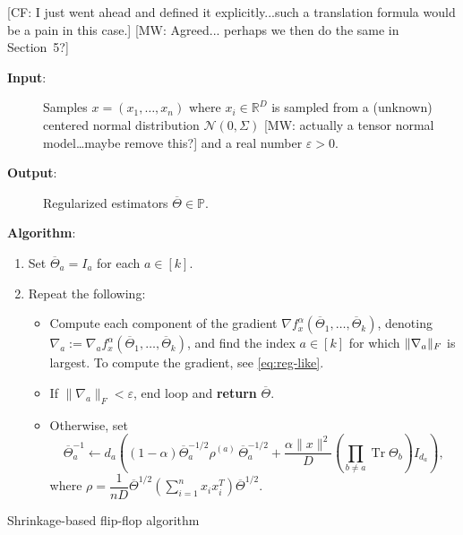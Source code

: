 \documentclass[aos]{imsart}
\theoremstyle{definition}
\numberwithin{equation}{section}
\DeclareMathOperator{\tr}{Tr}
\DeclarePairedDelimiter{\norm}{\lVert}{\rVert}
\newcommand{\R}{{\mathbb{R}}}
\newcommand{\otheta}{\overline{\Theta}}
\newcommand{\eps}{\varepsilon}
\newcommand{\cN}{\mathcal{N}}
\newcommand{\SPD}{\mathbb{P}}
\newcommand{\samp}{x}
\newcommand{\CF}[1]{{\color{purple}[CF: #1]}}
\newcommand{\MW}[1]{{\color{red}[MW: #1]}}
\newcommand{\CF}[1]{{}}
\newcommand{\MW}[1]{{}}
\begin{document}
\CF{I just went ahead and defined it explicitly...such a translation formula would be a pain in this case.}
\MW{Agreed... perhaps we then do the same in Section~5?}
\begin{Algorithm}
\begin{description}
\item[\hspace{.2cm}\textbf{Input}:] Samples $\samp = (\samp_1, \ldots, \samp_n)$ where $\samp_i \in \R^D$ is sampled from a (unknown) centered normal distribution $\cN(0, \Sigma)$ \MW{actually a tensor normal model\dots maybe remove this?} and a real number $\eps > 0$.

\item[\hspace{.2cm}\textbf{Output}:] Regularized estimators $\otheta \in \SPD$.\\[.1ex]

\item[\hspace{.2cm}\textbf{Algorithm}:]
\end{description}
\begin{enumerate}
\item\label{it:flip-flop step 1 reg} Set $\otheta_a = I_a$ for each $a \in [k]$.
\item\label{it:flip-flop step 2 reg} Repeat the following:
\begin{itemize}
\item Compute each component of the gradient $\nabla f^\alpha_{\samp}(\otheta_1, \ldots, \otheta_k)$, denoting $\nabla_a := \nabla_a f^\alpha_{\samp}(\otheta_1, \ldots, \otheta_k)$, and find the index $a \in [k]$ for which $\norm{\nabla_a}_F$ is largest. To compute the gradient, see \cref{eq:reg-like}.
\item If $\|\nabla_a \|_F < \eps$, end loop and \textbf{return} $\overline{\Theta}$.
\item Otherwise, set
$$\otheta_a^{-1} \leftarrow  d_a \left((1 - \alpha) \otheta_a^{-1/2} \rho^{(a)} \, \otheta_a^{-1/2} + \frac{\alpha \|x\|^2}{D} (\prod_{b \neq a} \tr \Theta_b) I_{d_a}  \right),$$
where $\rho = \dfrac{1}{nD} \otheta^{1/2} \left( \sum_{i=1}^n x_ix_i^T \right) \otheta^{1/2}.$

\end{itemize}
\end{enumerate}
\caption{Shrinkage-based flip-flop algorithm}\label{alg:reg-flip-flop}
\end{Algorithm}
\end{document}
